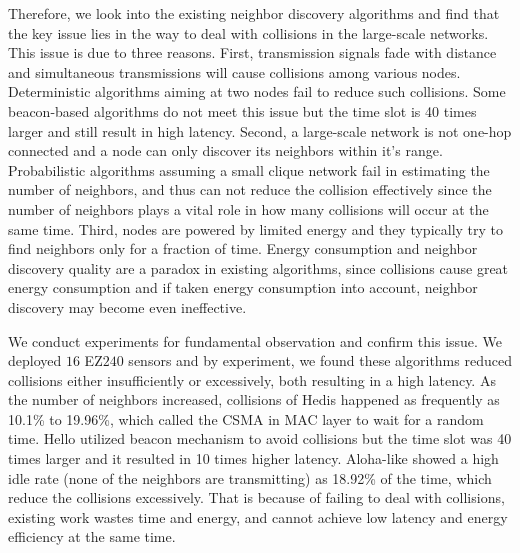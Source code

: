 Therefore, we look into the existing neighbor discovery algorithms and find that the key issue lies in the way to deal with collisions in the large-scale networks. %
This issue is due to three reasons.
First, transmission signals fade with distance and simultaneous transmissions will cause collisions among various nodes. Deterministic algorithms aiming at two nodes \cite{kandhalu2010u, chen2015heterogeneous} fail to reduce such collisions. Some beacon-based algorithms \cite{dutta2008practical, bakht2012searchlight, sun2014hello} do not meet this issue but the time slot is 40 times larger and still result in high latency. 
Second, a large-scale network is not one-hop connected and a node can only discover its neighbors within it's range. Probabilistic algorithms \cite{vasudevan2009neighbor, you2011aloha, song2014probabilistic} assuming a small clique network fail in estimating the number of neighbors, and thus can not reduce the collision effectively since the number of neighbors plays a vital role in how many collisions will occur at the same time. 
Third, nodes are powered by limited energy and they typically try to find neighbors only for a fraction of time. Energy consumption and neighbor discovery quality are a paradox in existing algorithms, since collisions cause great energy consumption and if taken energy consumption into account, neighbor discovery may become even ineffective.

We conduct experiments for fundamental observation and confirm this issue. We deployed $16$ EZ$240$ sensors and 
by experiment, we found these algorithms reduced collisions either insufficiently or excessively, both resulting in a high latency.
As the number of neighbors increased, collisions of Hedis \cite{chen2015heterogeneous} happened as frequently as 10.1\% to 19.96\%, which called the CSMA \cite{bianchi1996performance} in MAC layer to wait for a random time. Hello \cite{sun2014hello} utilized beacon mechanism to avoid collisions but the time slot was 40 times larger and it resulted in 10 times higher latency.  Aloha-like \cite{you2011aloha} showed a high idle rate (none of the neighbors are transmitting) as 18.92\% of the time, which reduce the collisions excessively.  %
That is because of failing to deal with collisions, existing work wastes time and energy, and cannot achieve low latency and energy efficiency at the same time.

